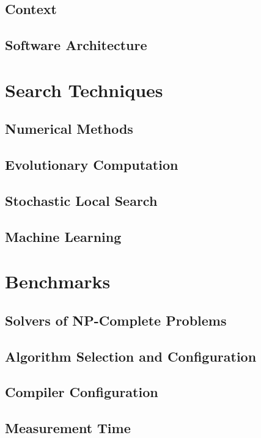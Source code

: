 \subsection{Context}
\label{subsec:context}

\subsection{Software Architecture}
\label{subsec:arch}

\section{Search Techniques}
\label{sec:techniques}

\subsection{Numerical Methods}
\label{subsec:num}

\subsection{Evolutionary Computation}
\label{subsec:tuninevolcomp}

\subsection{Stochastic Local Search}
\label{subsec:tuningsls}

\subsection{Machine Learning}
\label{subsec:tuningml}

\section{Benchmarks}
\label{sec:benchmarks}

\subsection{Solvers of NP-Complete Problems}
\label{subsec:np}

\subsection{Algorithm Selection and Configuration}
\label{subsec:algsel}

\subsection{Compiler Configuration}
\label{subsec:compilerconfig}

\subsection{Measurement Time}
\label{subsec:measure}
